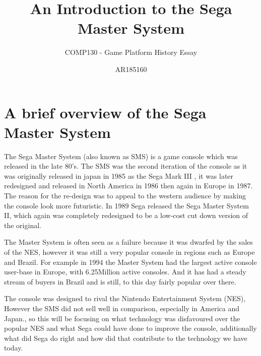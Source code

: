 \documentclass{scrartcl}
\title{An Introduction to the Sega Master System}
\subtitle{COMP130 - Game Platform History Essay}
\author{AR185160}
\begin{document}
\maketitle






\section{A brief overview of the Sega Master System}

The Sega Master System (also known as SMS) is a game console which was released in the late 80’s. The SMS was the second iteration of the console as it was originally released in japan in 1985 as the Sega Mark III \cite{Weiss2009}, it was later redesigned and released in North America in 1986 then again in Europe in 1987. The reason for the re-design was to appeal to the western audience by making the console look more futuristic\cite{parkin}. In 1989 Sega released the Sega Master System II, which again was completely redesigned to be a low-cost cut down version of the original.

The Master System is often seen as a failure because it was dwarfed by the sales of the NES, however it was still a very popular console in regions such as Europe and Brazil. For example in 1994 the Master System had the largest active console user-base in Europe, with 6.25Million active consoles.\cite{russell} And it has had a steady stream of buyers in Brazil and is still, to this day fairly popular over there.


The console was designed to rival the Nintendo Entertainment System (NES), However the SMS did not sell well in comparison, especially in America and Japan.\cite{Orland}, so this will be focusing on what technology was disfavoured over the popular NES and what Sega could have done to improve the console, additionally what did Sega do right and how did that contribute to the technology we have today.
\end{document}

